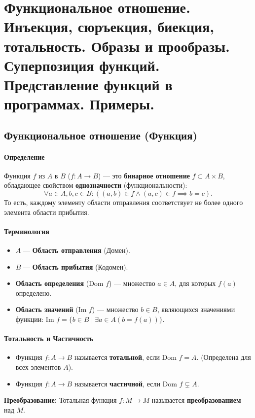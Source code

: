 \section{Функциональное отношение. Инъекция, сюръекция, биекция, тотальность. Образы и прообразы. Суперпозиция функций. Представление функций в программах. Примеры.}

\subsection*{Функциональное отношение (Функция)}

\paragraph{Определение}
Функция $f$ из $A$ в $B$ ($f: A \to B$) --- это \textbf{бинарное отношение} $f \subset A \times B$, обладающее свойством \textbf{однозначности} (функциональности):
$$\forall a \in A, b, c \in B: ((a, b) \in f \land (a, c) \in f \implies b = c).$$
То есть, каждому элементу области отправления соответствует не более одного элемента области прибытия.

\paragraph{Терминология}
\begin{itemize}
    \item $A$ --- \textbf{Область отправления} (Домен).
    \item $B$ --- \textbf{Область прибытия} (Кодомен).
    \item \textbf{Область определения} ($\text{Dom } f$) --- множество $a \in A$, для которых $f(a)$ определено.
    \item \textbf{Область значений} ($\text{Im } f$) --- множество $b \in B$, являющихся значениями функции: $\text{Im } f = \{b \in B \mid \exists a \in A (b = f(a))\}$.
\end{itemize}

\paragraph{Тотальность и Частичность}
\begin{itemize}
    \item Функция $f: A \to B$ называется \textbf{тотальной}, если $\text{Dom } f = A$. (Определена для всех элементов $A$).
    \item Функция $f: A \to B$ называется \textbf{частичной}, если $\text{Dom } f \subsetneq A$.
\end{itemize}
\textbf{Преобразование:} Тотальная функция $f: M \to M$ называется \textbf{преобразованием} над $M$.

